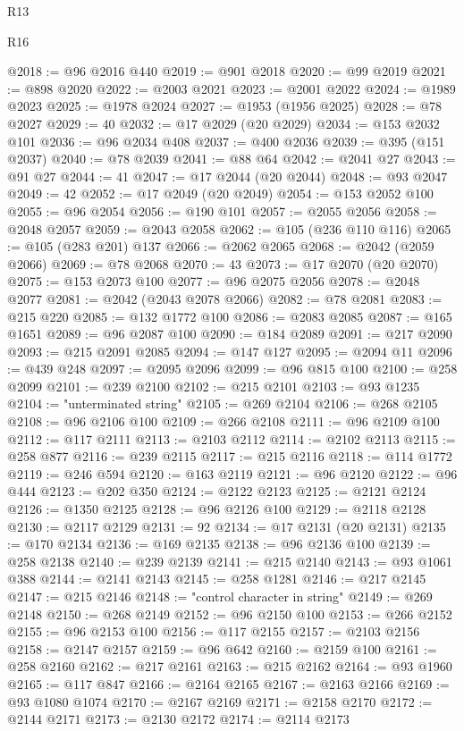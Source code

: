 \begin{lexlean}{R13}
\begin{lexlean}{R16}
\begin{coremodule}
{{{{{{{{{{{{{{{{{{{{{{{{{{{{{{{{{{{{{{{{{{{{{{{{{{{{{{{{{{{{{{{{{{{{{{{{{{{{{{{{{{{{{{{{{{{{{{{{{{{{{{{{{{{{{{{{{@2018 := @96 @2016 @440
@2019 := @901 @2018
@2020 := @99 @2019
@2021 := @898 @2020
@2022 := @2003 @2021
@2023 := @2001 @2022
@2024 := @1989 @2023
@2025 := @1978 @2024
@2027 := @1953 (@1956 @2025)
@2028 := @78 @2027
@2029 := 40
@2032 := @17 @2029 (@20 @2029)
@2034 := @153 @2032 @101
@2036 := @96 @2034 @408
@2037 := @400 @2036
@2039 := @395 (@151 @2037)
@2040 := @78 @2039
@2041 := @88 @64
@2042 := @2041 @27
@2043 := @91 @27
@2044 := 41
@2047 := @17 @2044 (@20 @2044)
@2048 := @93 @2047
@2049 := 42
@2052 := @17 @2049 (@20 @2049)
@2054 := @153 @2052 @100
@2055 := @96 @2054
@2056 := @190 @101
@2057 := @2055 @2056
@2058 := @2048 @2057
@2059 := @2043 @2058
@2062 := @105 (@236 @110 @116)
@2065 := @105 (@283 @201) @137
@2066 := @2062 @2065
@2068 := @2042 (@2059 @2066)
@2069 := @78 @2068
@2070 := 43
@2073 := @17 @2070 (@20 @2070)
@2075 := @153 @2073 @100
@2077 := @96 @2075 @2056
@2078 := @2048 @2077
@2081 := @2042 (@2043 @2078 @2066)
@2082 := @78 @2081
@2083 := @215 @220
@2085 := @132 @1772 @100
@2086 := @2083 @2085
@2087 := @165 @1651
@2089 := @96 @2087 @100
@2090 := @184 @2089
@2091 := @217 @2090
@2093 := @215 @2091 @2085
@2094 := @147 @127
@2095 := @2094 @11
@2096 := @439 @248
@2097 := @2095 @2096
@2099 := @96 @815 @100
@2100 := @258 @2099
@2101 := @239 @2100
@2102 := @215 @2101
@2103 := @93 @1235
@2104 := "unterminated string"
@2105 := @269 @2104
@2106 := @268 @2105
@2108 := @96 @2106 @100
@2109 := @266 @2108
@2111 := @96 @2109 @100
@2112 := @117 @2111
@2113 := @2103 @2112
@2114 := @2102 @2113
@2115 := @258 @877
@2116 := @239 @2115
@2117 := @215 @2116
@2118 := @114 @1772
@2119 := @246 @594
@2120 := @163 @2119
@2121 := @96 @2120
@2122 := @96 @444
@2123 := @202 @350
@2124 := @2122 @2123
@2125 := @2121 @2124
@2126 := @1350 @2125
@2128 := @96 @2126 @100
@2129 := @2118 @2128
@2130 := @2117 @2129
@2131 := 92
@2134 := @17 @2131 (@20 @2131)
@2135 := @170 @2134
@2136 := @169 @2135
@2138 := @96 @2136 @100
@2139 := @258 @2138
@2140 := @239 @2139
@2141 := @215 @2140
@2143 := @93 @1061 @388
@2144 := @2141 @2143
@2145 := @258 @1281
@2146 := @217 @2145
@2147 := @215 @2146
@2148 := "control character in string"
@2149 := @269 @2148
@2150 := @268 @2149
@2152 := @96 @2150 @100
@2153 := @266 @2152
@2155 := @96 @2153 @100
@2156 := @117 @2155
@2157 := @2103 @2156
@2158 := @2147 @2157
@2159 := @96 @642
@2160 := @2159 @100
@2161 := @258 @2160
@2162 := @217 @2161
@2163 := @215 @2162
@2164 := @93 @1960
@2165 := @117 @847
@2166 := @2164 @2165
@2167 := @2163 @2166
@2169 := @93 @1080 @1074
@2170 := @2167 @2169
@2171 := @2158 @2170
@2172 := @2144 @2171
@2173 := @2130 @2172
@2174 := @2114 @2173
}}}}}}}}}}}}}}}}}}}}}}}}}}}}}}}}}}}}}}}}}}}}}}}}}}}}}}}}}}}}}}}}}}}}}}}}}}}}}}}}}}}}}}}}}}}}}}}}}}}}}}}}}}}}}}}}}
\end{coremodule}
\end{lexlean}
\end{lexlean}
